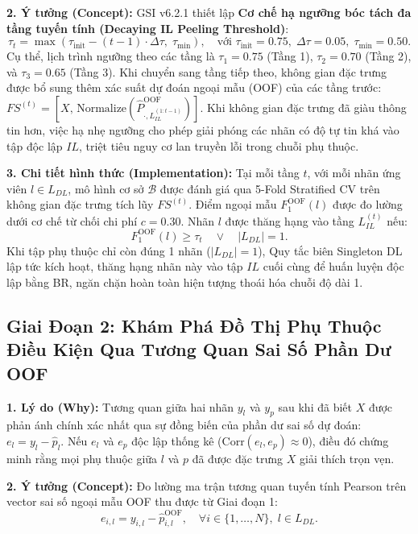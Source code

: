 \documentclass[10pt,a4paper,twoside]{article}
\begin{document}
\vspace{0.3em}
\noindent\textbf{2. Ý tưởng (Concept):} GSI v6.2.1 thiết lập \textbf{Cơ chế hạ ngưỡng bóc tách đa tầng tuyến tính (Decaying IL Peeling Threshold)}:
\begin{equation}
\tau_t = \max\left(\tau_{\text{init}} - (t - 1) \cdot \Delta\tau, \; \tau_{\min}\right), \quad \text{với } \tau_{\text{init}} = 0.75, \; \Delta\tau = 0.05, \; \tau_{\min} = 0.50.
\end{equation}
Cụ thể, lịch trình ngưỡng theo các tầng là $\tau_1 = 0.75$ (Tầng 1), $\tau_2 = 0.70$ (Tầng 2), và $\tau_3 = 0.65$ (Tầng 3). Khi chuyển sang tầng tiếp theo, không gian đặc trưng được bổ sung thêm xác suất dự đoán ngoại mẫu (OOF) của các tầng trước: $FS^{(t)} = [X, \, \text{Normalize}(\hat{P}_{\cdot, L_{IL}^{(1:t-1)}}^{\text{OOF}})]$. Khi không gian đặc trưng đã giàu thông tin hơn, việc hạ nhẹ ngưỡng cho phép giải phóng các nhãn có độ tự tin khá vào tập độc lập $IL$, triệt tiêu nguy cơ lan truyền lỗi trong chuỗi phụ thuộc.

\vspace{0.3em}
\noindent\textbf{3. Chi tiết hình thức (Implementation):} Tại mỗi tầng $t$, với mỗi nhãn ứng viên $l \in L_{DL}$, mô hình cơ sở $\mathcal{B}$ được đánh giá qua 5-Fold Stratified CV trên không gian đặc trưng tích lũy $FS^{(t)}$. Điểm ngoại mẫu $F_1^{\text{OOF}}(l)$ được đo lường dưới cơ chế từ chối chi phí $c = 0.30$. Nhãn $l$ được thăng hạng vào tầng $L_{IL}^{(t)}$ nếu:
\begin{equation}
F_1^{\text{OOF}}(l) \ge \tau_t \quad \lor \quad |L_{DL}| = 1.
\end{equation}
Khi tập phụ thuộc chỉ còn đúng 1 nhãn ($|L_{DL}| = 1$), Quy tắc biên Singleton DL lập tức kích hoạt, thăng hạng nhãn này vào tập $IL$ cuối cùng để huấn luyện độc lập bằng BR, ngăn chặn hoàn toàn hiện tượng thoái hóa chuỗi độ dài 1.

\subsection{Giai Đoạn 2: Khám Phá Đồ Thị Phụ Thuộc Điều Kiện Qua Tương Quan Sai Số Phần Dư OOF}
\noindent\textbf{1. Lý do (Why):} Tương quan giữa hai nhãn $y_l$ và $y_p$ sau khi đã biết $X$ được phản ánh chính xác nhất qua sự đồng biến của phần dư sai số dự đoán: $e_l = y_l - \hat{p}_l$. Nếu $e_l$ và $e_p$ độc lập thống kê ($\text{Corr}(e_l, e_p) \approx 0$), điều đó chứng minh rằng mọi phụ thuộc giữa $l$ và $p$ đã được đặc trưng $X$ giải thích trọn vẹn.

\vspace{0.3em}
\noindent\textbf{2. Ý tưởng (Concept):} Đo lường ma trận tương quan tuyến tính Pearson trên vector sai số ngoại mẫu OOF thu được từ Giai đoạn 1:
\begin{equation}
e_{i,l} = y_{i,l} - \hat{p}_{i,l}^{\text{OOF}}, \quad \forall i \in \{1, \dots, N\}, \; l \in L_{DL}.
\end{equation}
\end{document}
